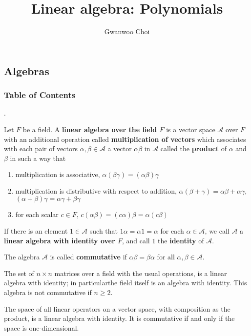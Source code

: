 \documentclass[8pt]{beamer}
\title{Linear algebra: Polynomials}
\author{Gwanwoo Choi}
\newcommand{\mc}[1]{\mathcal{#1}}
\newcommand{\tb}[1]{\textbf{#1}}
\begin{document}

\begin{frame}
    \titlepage
\end{frame}

\subsection{Algebras}
\begingroup
    \begin{frame}
        \frametitle{Table of Contents}
        \tableofcontents[currentsubsection]
    \end{frame}
\endgroup

\begin{frame}{.}
    \begin{definition} \label{def:1}
        Let $F$ be a field. A \tb{linear algebra over the field $F$} is a vector space $\mc{A}$ over $F$ with an additional operation called \tb{multiplication of vectors} which associates with each pair of vectors $\alpha, \beta \in \mc{A}$ a vector $\alpha \beta$ in $\mc{A}$ called the \tb{product} of $\alpha$ and $\beta$ in such a way that 
        \begin{enumerate}
            \item multiplication is associative, $\alpha(\beta \gamma) = (\alpha \beta) \gamma$
            \item multiplication is distributive with respect to addition, $\alpha(\beta + \gamma) = \alpha \beta + \alpha \gamma$, $(\alpha + \beta) \gamma = \alpha \gamma + \beta \gamma$
            \item for each scalar $c \in F$, $c(\alpha \beta) = (c\alpha)\beta = \alpha(c \beta)$
        \end{enumerate}
        If there is an element $1\in \mc{A}$ such that $1\alpha = \alpha 1 = \alpha$ for each $\alpha \in \mc{A}$, we call $\mc{A}$ a \tb{linear algebra with identity over $F$}, and call $1$ the \tb{identity} of $\mc{A}$.

        The algebra $\mc{A}$ is called \tb{commutative} if $\alpha \beta = \beta \alpha$ for all $\alpha, \beta \in \mc{A}$.
    \end{definition}

    \begin{example}
        The set of $n \times n$ matrices over a field with the usual operations, is a linear algebra with identity; in particularthe field itself is an algebra with identity.
        This algebra is not commutative if $n \geq 2$.
    \end{example}

    \begin{example}
        The space of all linear operators on a vector space, with composition as the product, is a linear algebra with identity.
        It is commutative if and only if the space is one-dimensional.
    \end{example}
\end{frame}
\end{document}
